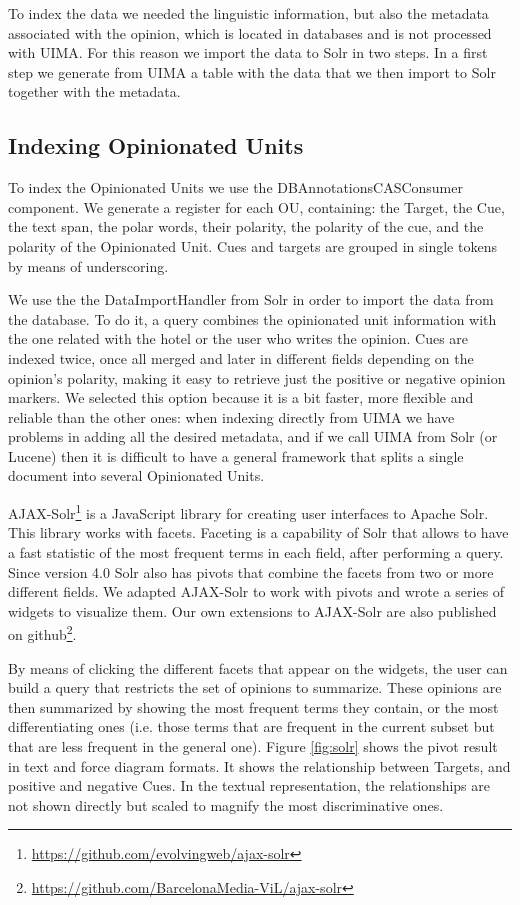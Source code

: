 \documentclass{llncs}
\begin{document}
To index the data we needed the linguistic information, but also the metadata associated with the opinion, which is located in databases and is not processed with UIMA. For this reason we import the data to Solr in two steps. In a first step we generate from UIMA a table with the data that we then import to Solr together with the metadata.

\subsection{Indexing Opinionated Units}

To index the Opinionated Units we use the DBAnnotationsCASConsumer component. We generate a register for each OU, containing: the Target, the Cue, the text span, the polar words, their polarity, the polarity of the cue, and the polarity of the Opinionated Unit. Cues and targets are grouped in single tokens by means of underscoring.

We use the the DataImportHandler from Solr in order to import the data from the database. To do it, a query combines the opinionated unit information with the one related with the hotel or the user who writes the opinion. Cues are indexed twice, once all merged and later in different fields depending on the opinion's polarity, making it easy to retrieve just the positive or negative opinion markers. We selected this option because it is a bit faster, more flexible and reliable than the other ones: when indexing directly from UIMA we have problems in adding all the desired metadata, and if we call UIMA from Solr (or Lucene) then it is difficult to have a general framework that splits a single document into several Opinionated Units.

AJAX-Solr\footnote{\url{https://github.com/evolvingweb/ajax-solr}} is a JavaScript library for creating user interfaces to Apache Solr. This library works with facets. Faceting is a capability of Solr that allows to have a fast statistic of the most frequent terms in each field, after performing a query. Since version 4.0 Solr also has pivots that combine the facets from two or more different fields. We adapted AJAX-Solr to work with pivots and wrote a series of widgets to visualize them. Our own extensions to AJAX-Solr are also published on github\footnote{\url{https://github.com/BarcelonaMedia-ViL/ajax-solr}}.

By means of clicking the different facets that appear on the widgets, the user can build a query that restricts the set of opinions to summarize. These opinions are then summarized by showing the most frequent terms they contain, or the most differentiating ones (i.e. those terms that are frequent in the current subset but that are less frequent in the general one). Figure \ref{fig:solr} shows the pivot result in text and force diagram formats. It shows the relationship between Targets, and positive and negative Cues. In the textual representation, the relationships are not shown directly but scaled to magnify the most discriminative ones. 
\end{document}

